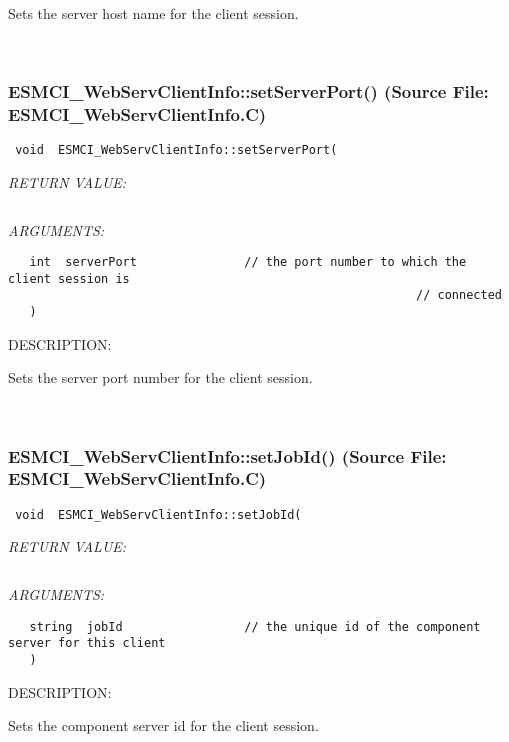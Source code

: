       Sets the server host name for the client session.
   
 
\mbox{}\hrulefill\
 
\subsubsection{ESMCI\_WebServClientInfo::setServerPort() (Source File: ESMCI\_WebServClientInfo.C)}


  
\begin{verbatim} void  ESMCI_WebServClientInfo::setServerPort(\end{verbatim}{\em RETURN VALUE:}
\begin{verbatim} \end{verbatim}{\em ARGUMENTS:}
\begin{verbatim}   int  serverPort               // the port number to which the client session is
                                                         // connected
   )\end{verbatim}
{\sf DESCRIPTION:\\ }


      Sets the server port number for the client session.
   
 
\mbox{}\hrulefill\
 
\subsubsection{ESMCI\_WebServClientInfo::setJobId() (Source File: ESMCI\_WebServClientInfo.C)}


  
\begin{verbatim} void  ESMCI_WebServClientInfo::setJobId(\end{verbatim}{\em RETURN VALUE:}
\begin{verbatim} \end{verbatim}{\em ARGUMENTS:}
\begin{verbatim}   string  jobId                 // the unique id of the component server for this client
   )\end{verbatim}
{\sf DESCRIPTION:\\ }


      Sets the component server id for the client session.
   
